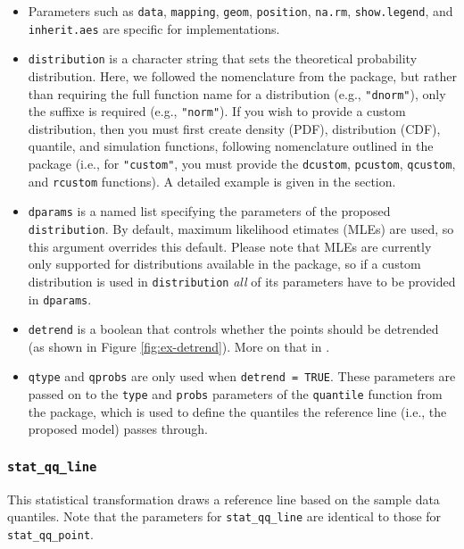 \begin{itemize}
\item
  Parameters such as \texttt{data}, \texttt{mapping}, \texttt{geom},
  \texttt{position}, \texttt{na.rm}, \texttt{show.legend}, and
  \texttt{inherit.aes} are specific for  implementations.
\item
  \texttt{distribution} is a character string that sets the theoretical
  probability distribution. Here, we followed the nomenclature from the
   package, but rather than requiring the full function name
  for a distribution (e.g., \texttt{"dnorm"}), only the suffixe is
  required (e.g., \texttt{"norm"}). If you wish to provide a custom
  distribution, then you must first create density (PDF), distribution
  (CDF), quantile, and simulation functions, following nomenclature
  outlined in the  package (i.e., for \texttt{"custom"}, you
  must provide the \texttt{dcustom}, \texttt{pcustom}, \texttt{qcustom},
  and \texttt{rcustom} functions). A detailed example is given in the
   section.
\item
  \texttt{dparams} is a named list specifying the parameters of the
  proposed \texttt{distribution}. By default, maximum likelihood
  etimates (MLEs) are used, so this argument overrides this default.
  Please note that MLEs are currently only supported for distributions
  available in the  package, so if a custom distribution is
  used in \texttt{distribution} \emph{all} of its parameters have to be
  provided in \texttt{dparams}.
\item
  \texttt{detrend} is a boolean that controls whether the points should
  be detrended (as shown in Figure \ref{fig:ex-detrend}). More on that
  in .
\item
  \texttt{qtype} and \texttt{qprobs} are only used when
  \texttt{detrend\ =\ TRUE}. These parameters are passed on to the
  \texttt{type} and \texttt{probs} parameters of the \texttt{quantile}
  function from the  package, which is used to define the
  quantiles the reference line (i.e., the proposed model) passes
  through.
\end{itemize}

\subsubsection{\texorpdfstring{\texttt{stat\_qq\_line}}{stat\_qq\_line}}\label{stat_qq_line}

This statistical transformation draws a reference line based on the
sample data quantiles. Note that the parameters for
\texttt{stat\_qq\_line} are identical to those for
\texttt{stat\_qq\_point}.

